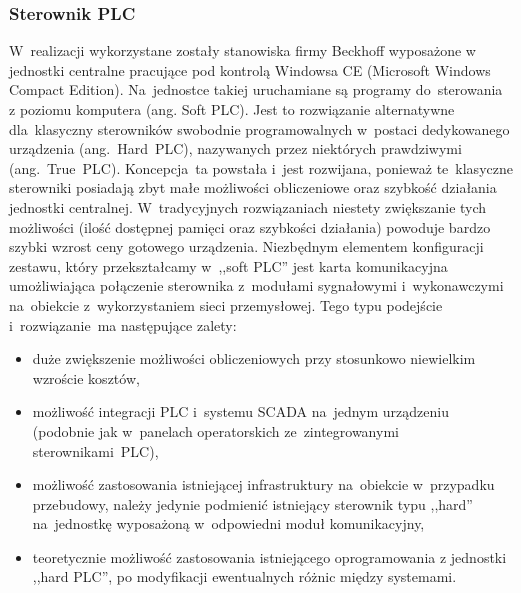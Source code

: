 \subsubsection{Sterownik PLC}
W~realizacji wykorzystane zostały stanowiska firmy Beckhoff wyposażone w jednostki centralne pracujące pod kontrolą Windowsa CE (Microsoft Windows Compact Edition). Na~jednostce takiej uruchamiane są programy do~sterowania z poziomu komputera (ang. Soft PLC). Jest to rozwiązanie alternatywne dla~klasyczny sterowników swobodnie programowalnych w~postaci dedykowanego urządzenia (ang.~Hard~PLC), nazywanych przez niektórych prawdziwymi (ang.~True~PLC).
Koncepcja~ta powstała i~jest rozwijana, ponieważ te~klasyczne sterowniki posiadają zbyt małe możliwości obliczeniowe oraz szybkość działania jednostki centralnej. W~tradycyjnych rozwiązaniach niestety zwiększanie tych możliwości (ilość dostępnej pamięci oraz szybkości działania) powoduje bardzo szybki wzrost ceny gotowego urządzenia.
Niezbędnym elementem konfiguracji zestawu, który przekształcamy w~,,soft PLC'' jest karta komunikacyjna umożliwiająca połączenie sterownika z~modułami sygnałowymi i~wykonawczymi na~obiekcie z~wykorzystaniem sieci przemysłowej.
Tego typu podejście i~rozwiązanie~ma następujące zalety:
\begin{itemize}
\item duże zwiększenie możliwości obliczeniowych przy stosunkowo niewielkim wzroście kosztów,
\item możliwość integracji PLC i~systemu SCADA na~jednym urządzeniu (podobnie jak w~panelach operatorskich ze~zintegrowanymi sterownikami~PLC),
\item możliwość zastosowania istniejącej infrastruktury na~obiekcie w~przypadku przebudowy, należy jedynie podmienić istniejący sterownik typu ,,hard'' na~jednostkę wyposażoną w~odpowiedni moduł komunikacyjny,
\item teoretycznie możliwość zastosowania istniejącego oprogramowania z jednostki ,,hard PLC'', po modyfikacji ewentualnych różnic między systemami.
\end{itemize}

